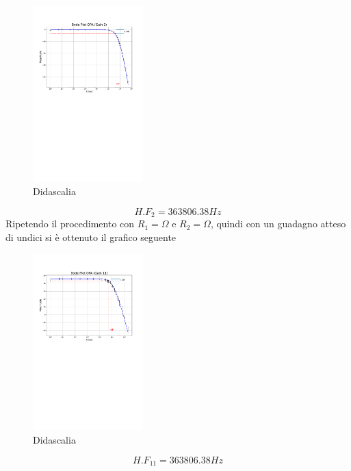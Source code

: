 \documentclass[journal]{IEEEtran}
\begin{document}
\begin{figure}[H]%
\begin {center}
\includegraphics[width=0.38\textwidth]{analysis/output/OPA-bode_gain2(mag).pdf}
\caption{Didascalia}
\label{fig:oscilloscope}
\end {center}
\end{figure}
\[H.F_{2} = 363806.38 Hz\]
Ripetendo il procedimento con $R_1=\Omega$ e $R_2=\Omega$, quindi con un guadagno atteso di undici si è ottenuto il grafico seguente
\begin{figure}[H]%
\begin {center}
\includegraphics[width=0.38\textwidth]{analysis/output/OPA-bode_gain11(mag).pdf}
\caption{Didascalia}
\label{fig:oscilloscope}
\end {center}
\end{figure}

\[H.F_{11} = 363806.38 Hz\]
\end{document}
